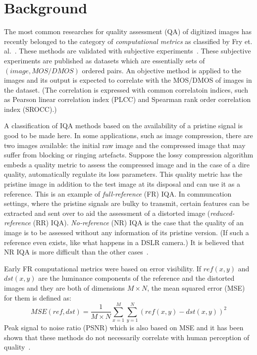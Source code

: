 \documentclass{article}
\begin{document}
\section{Background} \label{background}
The most common researches for quality assessment (QA) of digitized images has recently belonged to the category of \emph{computational metrics} as classified by Fry et. al.~\cite{fry2018bridging}. These methods are validated with subjective experiments~\cite{zhai2020perceptual}. These subjective experiments are published as datasets which are essentially sets of $(image, MOS/DMOS)$ ordered pairs. An objective method is applied to the images and its output is expected to correlate with the MOS/DMOS of images in the dataset. (The correlation is expressed with common correlatoin indices, such as Pearson linear correlation index (PLCC) and Spearman rank order correlation index (SROCC).)

A classification of IQA methods based on the availability of a pristine signal is good to be made here. In some applications, such as image compression, there are two images available: the initial raw image and the compressed image that may suffer from blocking or ringing artefacts. Suppose the lossy compression algorithm embeds a quality metric to assess the compressed image and in the case of a dire quality, automatically regulate its loss parameters. This quality metric has the pristine image in addition to the test image at its disposal and can use it as a reference. This is an example of \emph{full-reference} (FR) IQA. In communcation settings, where the pristine signals are bulky to transmit, certain features can be extracted and sent over to aid the assessment of a distorted image (\emph{reduced-reference} (RR) IQA). \emph{No-reference} (NR) IQA is the case that the quality of an image is to be assessed without any information of its pristine version. (If such a reference even exists, like what happens in a DSLR camera.) It is believed that NR IQA is more difficult than the other cases~\cite{kang2014convolutional}.

Early FR computational metrics were based on error visibility. If $ref(x, y)$ and $dst(x, y)$ are the luminance components of the reference and the distorted images and they are both of dimensions $M\times N$, the mean squared error (MSE) for them is defined as:
\begin{equation}
	\label{eq:mse}
	\displaystyle MSE(ref, dst) = \frac{1}{M\times N}\sum_{x=1}^M \sum_{y = 1}^N \left(ref(x, y)-dst(x, y)\right)^2
\end{equation}
Peak signal to noise ratio (PSNR) which is also based on MSE and it has been shown that these methods do not necessarily correlate with human perception of quality~\cite{wang2009mean}.
\end{document}
